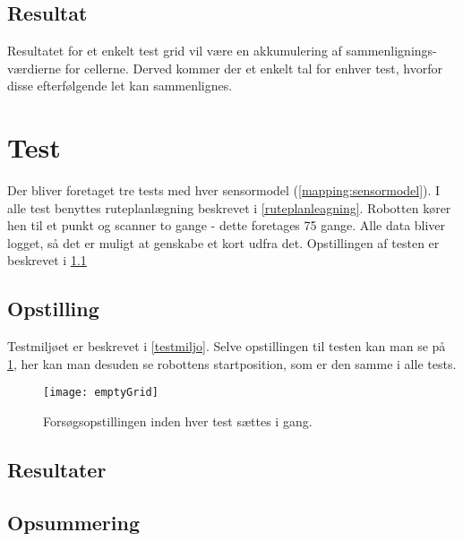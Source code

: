 \subsection{Resultat}
Resultatet for et enkelt test grid vil være en akkumulering af sammenlignings-værdierne for cellerne.
Derved kommer der et enkelt tal for enhver test, hvorfor disse efterfølgende let kan sammenlignes.

\section{Test}\label{evaluering:test_beskrivelse}
Der bliver foretaget tre tests med hver sensormodel (\cref{mapping:sensormodel}).
I alle test benyttes ruteplanlægning beskrevet i \cref{ruteplanleagning}.
Robotten kører hen til et punkt og scanner to gange - dette foretages 75 gange.
Alle data bliver logget, så det er muligt at genskabe et kort udfra det.
Opstillingen af testen er beskrevet i \cref{evaluering:opstilling}

\subsection{Opstilling}\label{evaluering:opstilling}
Testmiljøet er beskrevet i \cref{testmiljo}.
Selve opstillingen til testen kan man se på \cref{evaluering:emptyGrid}, her kan man desuden se robottens startposition, som er den samme i alle tests.

\begin{figure}[h]
\texttt{[image: emptyGrid]}
\caption{Forsøgsopstillingen inden hver test sættes i gang.}
\label{evaluering:emptyGrid}
\end{figure}
\subsection{Resultater}

\subsection{Opsummering}